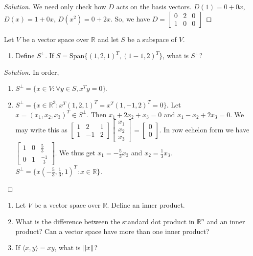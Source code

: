 \documentclass[../main.tex]{subfiles}
\begin{document}
\begin{proof}[Solution]
We need only check how $D$ acts on the basis vectors. $D(1) = 0+0x$, $D(x) = 1+0x$, $D(x^2) = 0+2x$. So, we have $D = \begin{bmatrix} 0 & 2 & 0 \\ 1 & 0 & 0 \end{bmatrix}$
\end{proof}
%
\begin{problem}
Let $V$ be a vector space over $\mathbb{R}$ and let $S$ be a subspace of $V$.
\begin{enumerate}
\item Define $S^{\perp}$.
If $S = $Span$\{ (1,2,1)^T, (1-1,2)^T\}$, what is $S^{\perp}$?
\end{enumerate}
\end{problem}
\begin{proof}[Solution]
In order,
\begin{enumerate}
\item $S^{\perp} = \{x\in V: \forall y\in S, x^T y = 0\}$.
\item $S^{\perp} = \{x\in \mathbb{R}^3: x^T (1,2,1)^T = x^T(1,-1,2)^T = 0\}$. Let $x = (x_1,x_2,x_3)^T \in S^{\perp}$. Then $x_1+2x_2+x_3=0$ and $x_1-x_2+2x_3 = 0$. We may write this as $\begin{bmatrix} 1 & 2 & 1 \\ 1 & -1 & 2 \end{bmatrix} \begin{bmatrix} x_1 \\ x_2\\ x_3 \end{bmatrix} = \begin{bmatrix} 0 \\ 0 \end{bmatrix}$. In row echelon form we have $\begin{bmatrix} 1 & 0 & \frac{5}{3} \\ 0 & 1 & \frac{-1}{3} \end{bmatrix}$. We thus get $x_1 = - \frac{5}{3}x_3$ and $x_2 = \frac{1}{3} x_3$.  $S^{\perp} = \{x(-\frac{5}{3}, \frac{1}{3}, 1)^T: x\in \mathbb{R}\}$.
\end{enumerate}
\end{proof}
%
\begin{problem}
\begin{enumerate}
\item Let $V$ be a vector space over $\mathbb{R}$. Define an inner product.
\item What is the difference between the standard dot product in $\mathbb{R}^n$ and an inner product? Can a vector space have more than one inner product?
\item If $\langle x,y \rangle = xy$, what is $\norm{x}$?
\end{enumerate}
\end{problem}
\end{document}
